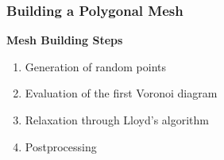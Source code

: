 \begin{frame} %
    \frametitle{Building a Polygonal Mesh}

    \vspace*{\fill}
    \begin{multicols}{2}
        
        \vspace*{\fill}
        \begin{center}
            {\color{\accentcolor} \Large \textbf{Mesh Building Steps}}
            \vspace*{0.5cm}

            \begin{minipage}{0.4\textwidth}
                \begin{enumerate}
                    \item Generation of random points
                    \item Evaluation of the first Voronoi diagram
                    \item {\color{\accentcolor} Relaxation through Lloyd's algorithm}
                    \item Postprocessing
                \end{enumerate}
            \end{minipage}
        \end{center}
        \vspace*{\fill}

        \vfill\null
        \columnbreak

        \vspace*{\fill}
        \begin{figure}[!ht]
            \centering
            
        \end{figure}
        \vspace*{\fill}

    \end{multicols}
    \vspace*{\fill}
    
\end{frame}

